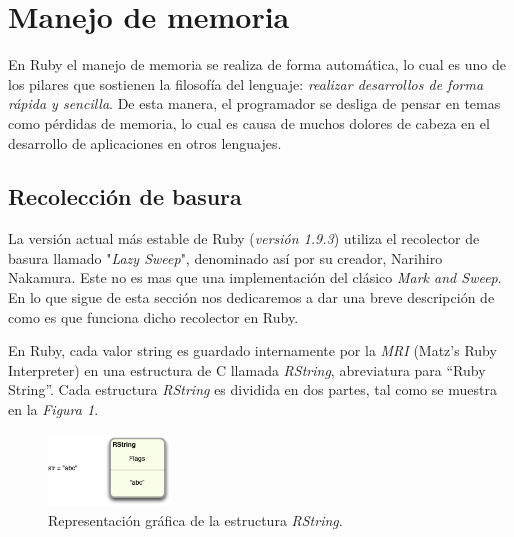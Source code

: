 \documentclass{article}
\begin{document}
 
\bigskip\bigskip




\section{Manejo de memoria}

	En Ruby el manejo de memoria se realiza de forma automática, lo cual es uno de los pilares que sostienen la filosofía del lenguaje: \textit{realizar desarrollos de forma rápida y sencilla}. De esta manera, el programador se desliga de pensar en temas como pérdidas de memoria, lo cual es causa de muchos dolores de cabeza en el desarrollo de aplicaciones en otros lenguajes.
\bigskip



\subsection{Recolección de basura}

	La versión actual más estable de Ruby (\textit{versión 1.9.3}) utiliza el recolector de basura llamado "\textit{Lazy Sweep}", denominado así por su creador, Narihiro Nakamura. Este no es mas que una implementación del clásico \textit{Mark and Sweep}. En lo que sigue de esta sección nos dedicaremos a dar una breve descripción de como es que funciona dicho recolector en Ruby.
	\par
	En Ruby, cada valor string es guardado internamente por la \textit{MRI} (Matz's Ruby Interpreter) en una estructura de C llamada \textit{RString}, abreviatura para ``Ruby String''. Cada estructura \textit{RString} es dividida en dos partes, tal como se muestra en la \textit{Figura 1}.
\bigskip

\begin{figure}[h]
	\centering
	\includegraphics[width=0.29\textwidth]{images/gc/gc01-rstring.png}
	\caption{Representación gráfica de la estructura \textit{RString}.}
\end{figure}
\bigskip
\end{document}
